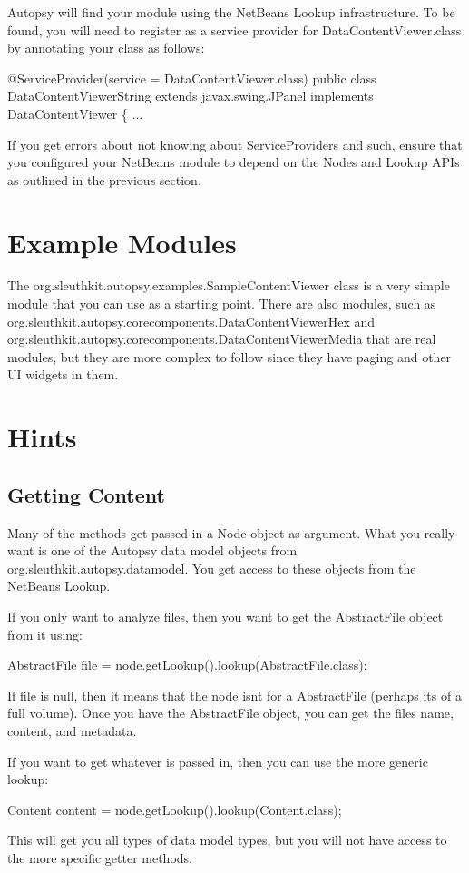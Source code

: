 Autopsy will find your module using the Net\+Beans Lookup infrastructure. To be found, you will need to register as a service provider for Data\+Content\+Viewer.\+class by annotating your class as follows\+:


\begin{DoxyCode}
@ServiceProvider(service = DataContentViewer.class)
public class DataContentViewerString extends javax.swing.JPanel implements DataContentViewer \{
...
\end{DoxyCode}


If you get errors about not knowing about Service\+Providers and such, ensure that you configured your Net\+Beans module to depend on the Nodes and Lookup A\+P\+Is as outlined in the previous section.\hypertarget{mod_content_page_content_examples}{}\section{Example Modules}\label{mod_content_page_content_examples}
The org.\+sleuthkit.\+autopsy.\+examples.\+Sample\+Content\+Viewer class is a very simple module that you can use as a starting point. There are also modules, such as org.\+sleuthkit.\+autopsy.\+corecomponents.\+Data\+Content\+Viewer\+Hex and org.\+sleuthkit.\+autopsy.\+corecomponents.\+Data\+Content\+Viewer\+Media that are real modules, but they are more complex to follow since they have paging and other UI widgets in them.\hypertarget{mod_content_page_content_hints}{}\section{Hints}\label{mod_content_page_content_hints}
\hypertarget{mod_content_page_content_hints_objects}{}\subsection{Getting Content}\label{mod_content_page_content_hints_objects}
Many of the methods get passed in a Node object as argument. What you really want is one of the Autopsy data model objects from org.\+sleuthkit.\+autopsy.\+datamodel. You get access to these objects from the Net\+Beans Lookup.

If you only want to analyze files, then you want to get the Abstract\+File object from it using\+: 
\begin{DoxyCode}
AbstractFile file = node.getLookup().lookup(AbstractFile.class);
\end{DoxyCode}
 If file is null, then it means that the node isn\textquotesingle{}t for a Abstract\+File (perhaps its of a full volume). Once you have the Abstract\+File object, you can get the file\textquotesingle{}s name, content, and metadata.

If you want to get whatever is passed in, then you can use the more generic lookup\+: 
\begin{DoxyCode}
Content content = node.getLookup().lookup(Content.class);
\end{DoxyCode}
 This will get you all types of data model types, but you will not have access to the more specific getter methods. 